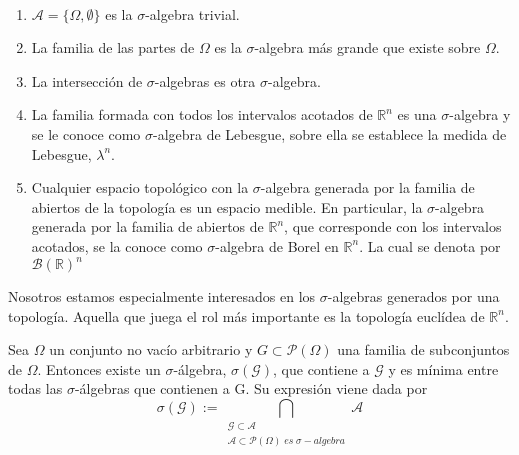      \begin{ejemplo}~\smallskip
       \begin{enumerate}
           \item $\mathcal{A} = \{\Omega, \emptyset\}$ es la $\sigma$-algebra trivial.
           
           \item La familia de las partes de $\Omega$ es la $\sigma$-algebra más grande que existe sobre $\Omega$.
           
           \item La intersección de $\sigma$-algebras es otra $\sigma$-algebra.
           
           \item La familia formada con todos los intervalos acotados de $\mathbb{R}^n$ es una $\sigma$-algebra y se le conoce como $\sigma$-algebra de Lebesgue, sobre ella se establece la medida de Lebesgue, $\lambda^n$. 
           
           \item Cualquier espacio topológico con la $\sigma$-algebra generada por la familia de abiertos de la topología es un espacio medible. En particular, la $\sigma$-algebra generada por la familia de abiertos de $\mathbb{R}^n$, que corresponde con los intervalos acotados, se la conoce como $\sigma$-algebra de Borel en $\mathbb{R}^n$. La cual se denota por $\mathcal{B}(\mathbb{R})^n$
       \end{enumerate}
    \end{ejemplo}
    
    Nosotros estamos especialmente interesados en los $\sigma$-algebras generados por una topología. Aquella que juega el rol más importante es la topología euclídea de $\mathbb{R}^n$. 
    
    \begin{teorema}
    Sea $\Omega$ un conjunto no vacío arbitrario y $G \subset \mathcal{P}(\Omega)$ una familia de subconjuntos de $\Omega$. Entonces existe un $\sigma$-álgebra, $\sigma(\mathcal{G})$, que contiene a $\mathcal{G}$ y es mínima entre todas las $\sigma$-álgebras que contienen a G. Su expresión viene dada por
    $$\sigma(\mathcal{G}) := \bigcap_{\substack{ \mathcal{G} \subset \mathcal{A} \\ \mathcal{A} \subset \mathcal{P}(\Omega) \; es \; \sigma-algebra }} \mathcal{A} $$
    
    \end{teorema}
    
